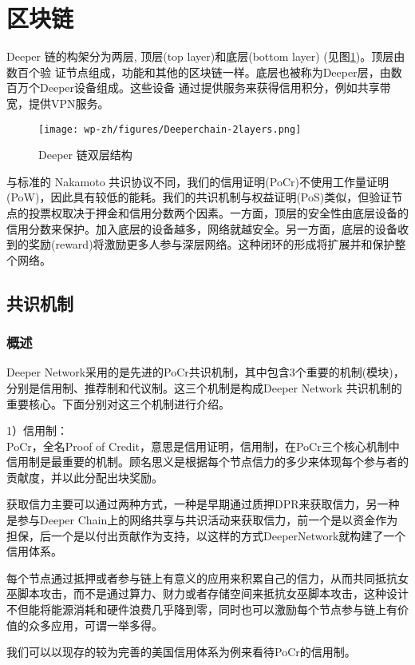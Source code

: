 \documentclass[a4paper]{article}
\begin{document}
\newpage
\section{区块链}
Deeper 链的构架分为两层, 顶层(top layer)和底层(bottom layer) (见图\ref{fig:2-layers})。顶层由数百个验
证节点组成，功能和其他的区块链一样。底层也被称为Deeper层，由数百万个Deeper设备组成。这些设备 通过提供服务来获得信用积分，例如共享带宽，提供VPN服务。

\begin{figure}[hhhh]
\centering
\texttt{[image: wp-zh/figures/Deeperchain-2layers.png]}
\caption{Deeper 链双层结构}
\label{fig:2-layers}
\end{figure}

与标准的 Nakamoto 共识协议不同，我们的信用证明(PoCr)不使用工作量证明(PoW)，因此具有较低的能耗。我们的共识机制与权益证明(PoS)类似，但验证节点的投票权取决于押金和信用分数两个因素。一方面，顶层的安全性由底层设备的信用分数来保护。加入底层的设备越多，网络就越安全。另一方面，底层的设备收到的奖励(reward)将激励更多人参与深层网络。这种闭环的形成将扩展并和保护整个网络。

\subsection{共识机制}
\subsubsection{概述}
Deeper Network采用的是先进的PoCr共识机制，其中包含3个重要的机制(模块)，分别是信用制、推荐制和代议制。这三个机制是构成Deeper Network 共识机制的重要核心。下面分别对这三个机制进行介绍。

 1）信用制：\\
PoCr，全名Proof of Credit，意思是信用证明，信用制，在PoCr三个核心机制中信用制是最重要的机制。顾名思义是根据每个节点信力的多少来体现每个参与者的贡献度，并以此分配出块奖励。

获取信力主要可以通过两种方式，一种是早期通过质押DPR来获取信力，另一种是参与Deeper Chain上的网络共享与共识活动来获取信力，前一个是以资金作为担保，后一个是以付出贡献作为支持，以这样的方式DeeperNetwork就构建了一个信用体系。

每个节点通过抵押或者参与链上有意义的应用来积累自己的信力，从而共同抵抗女巫脚本攻击，而不是通过算力、财力或者存储空间来抵抗女巫脚本攻击，这种设计不但能将能源消耗和硬件浪费几乎降到零，同时也可以激励每个节点参与链上有价值的众多应用，可谓一举多得。

我们可以以现存的较为完善的美国信⽤体系为例来看待PoCr的信用制。
\end{document}
